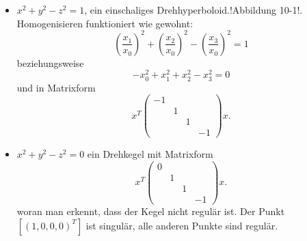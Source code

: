 \documentclass[11pt]{article}
\begin{document}
\begin{example}
\begin{itemize}
    \item $x^2+y^2-z^2 = 1$, ein einschaliges Drehhyperboloid.!Abbildung 10-1!. Homogenisieren funktioniert wie gewohnt:
    \begin{equation*}
        \left(\frac{x_1}{x_0}\right)^2 + \left(\frac{x_2}{x_0}\right)^2 - \left(\frac{x_3}{x_0}\right)^2 = 1
    \end{equation*}
    beziehungsweise \begin{equation*}
        -x_0^2 + x_1^2 + x_2^2-x_3^2 = 0
    \end{equation*}
    und in Matrixform 
    \begin{equation*}
        x^T\left(\begin{array}{cccc}
             -1  \\
             &1\\
             &&1\\
             &&&-1
        \end{array}\right)x.
    \end{equation*}
    \item $x^2+y^2-z^2 = 0$ ein Drehkegel mit Matrixform \begin{equation*}
        x^T\left(\begin{array}{cccc}
             0  \\
             &1\\
             &&1\\
             &&&-1
        \end{array}\right)x.
    \end{equation*} woran man erkennt, dass der Kegel nicht regulär ist. Der Punkt $[(1,0,0,0)^T]$ ist singulär, alle anderen Punkte sind regulär.
\end{itemize}
\end{example}
\end{document}

